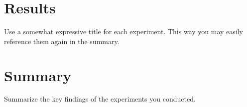 \section{Results}
\label{s:Experiment-Results}

Use a somewhat expressive title for each experiment. This way you may easily reference them again in the summary.


\section{Summary}
\label{s:Experiments-Summary}

Summarize the key findings of the experiments you conducted.

